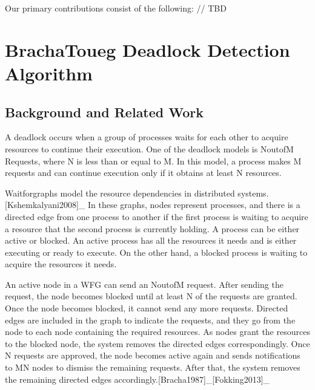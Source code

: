 \documentclass[letterpaper,10pt,english]{sphinxmanual}
\begin{document}
\sphinxAtStartPar
Our primary contributions consist of the following: // TBD

\sphinxstepscope


\section{Bracha\sphinxhyphen{}Toueg Deadlock Detection Algorithm}
\label{\detokenize{docs/BrachaTouegAlg/algorithm:brachatouegalg}}\label{\detokenize{docs/BrachaTouegAlg/algorithm::doc}}

\subsection{Background and Related Work}
\label{\detokenize{docs/BrachaTouegAlg/algorithm:background-and-related-work}}
\sphinxAtStartPar
A deadlock occurs when a group of processes waits for each other to acquire resources to continue their execution. One of the deadlock models is N\sphinxhyphen{}out\sphinxhyphen{}of\sphinxhyphen{}M Requests, where N is less than or equal to M. In this model, a process makes M requests and can continue execution only if it obtains at least N resources.

\sphinxAtStartPar
Wait\sphinxhyphen{}for\sphinxhyphen{}graphs model the resource dependencies in distributed systems.{[}Kshemkalyani2008{]}\_ In these graphs, nodes represent processes, and there is a directed edge from one process to another if the first process is waiting to acquire a resource that the second process is currently holding. A process can be either active or blocked. An active process has all the resources it needs and is either executing or ready to execute. On the other hand, a blocked process is waiting to acquire the resources it needs.

\sphinxAtStartPar
An active node in a WFG can send an N\sphinxhyphen{}out\sphinxhyphen{}of\sphinxhyphen{}M request. After sending the request, the node becomes blocked until at least N of the requests are granted. Once the node becomes blocked, it cannot send any more requests. Directed edges are included in the graph to indicate the requests, and they go from the node to each node containing the required resources. As nodes grant the resources to the blocked node, the system removes the directed edges correspondingly. Once N requests are approved, the node becomes active again and sends notifications to M\sphinxhyphen{}N nodes to dismiss the remaining requests. After that, the system removes the remaining directed edges accordingly.{[}Bracha1987{]}\_{[}Fokking2013{]}\_
\end{document}
